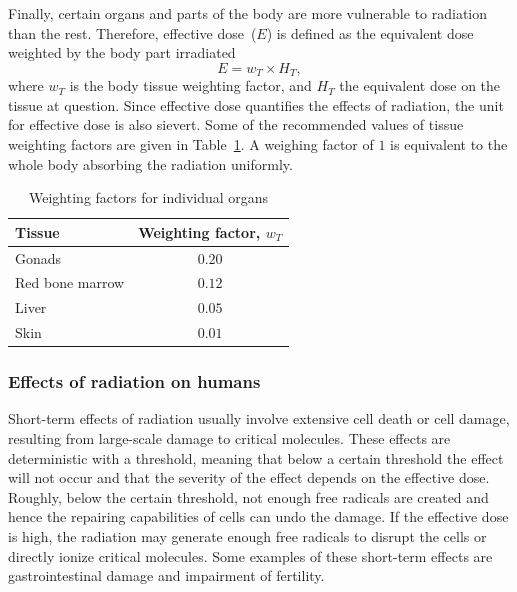 \documentclass[nofootinbib,preprint,aps]{revtex4-1}
\begin{document}
        Finally, certain organs and parts of the body are more vulnerable to radiation than the rest.
        Therefore, effective dose~($E$) is defined as the equivalent dose weighted by the body part
        irradiated
        \begin{equation}
            E = w_T \times H_T,
        \end{equation}
        where $w_T$ is the body tissue weighting factor, and $H_T$ the equivalent dose on the tissue
        at question. Since effective dose quantifies the effects of radiation, the unit for effective dose
        is also sievert.
        Some of the recommended values of tissue
        weighting factors are given in Table~\ref{tab:eff}. A weighing factor of $1$ is equivalent to the
        whole body absorbing the radiation uniformly.
        \begin{table}
            \centering
            \caption{Weighting factors for individual organs \cite{icrp74}}
            \begin{ruledtabular}
                \begin{tabular}{l c}
                Tissue & Weighting factor, $w_T$\\
                \hline
                Gonads & $0.20$\\
                Red bone marrow & $0.12$ \\
                Liver & $0.05$ \\
                Skin & $0.01$ \\
                \end{tabular}
                \label{tab:eff}
            \end{ruledtabular}
        \end{table}

        \subsubsection{Effects of radiation on humans}
        Short-term effects of radiation usually involve extensive cell death or cell damage, resulting
        from large-scale damage to critical molecules.\cite{u16}
        These effects are deterministic with a threshold,
        meaning that below a certain threshold the effect will not occur and that
        the severity of the effect depends on the effective dose. Roughly, below the certain threshold,
        not enough free radicals are created and hence the repairing capabilities of cells can undo the damage.
        If the effective dose is high, the radiation may generate enough free radicals to disrupt the cells or directly
        ionize critical molecules. Some examples of these short-term effects are gastrointestinal damage and impairment
        of fertility.\cite{u16}
\end{document}
